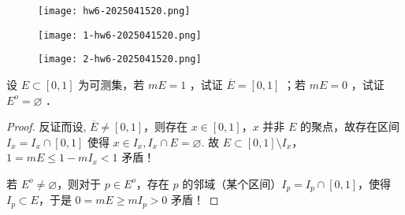 \begin{figure}[H]
\centering
\texttt{[image: hw6-2025041520.png]}
\label{}
\end{figure}
\begin{figure}[H]
\centering
\texttt{[image: 1-hw6-2025041520.png]}
\label{}
\end{figure}
\begin{figure}[H]
\centering
\texttt{[image: 2-hw6-2025041520.png]}
\label{}
\end{figure}

\begin{exercise}
设 $E \subset[0,1]$ 为可测集，若 $m E=1$ ，试证 $\overline{E}=[0,1]$ ；若 $m E=0$ ，试证 $E^o=\varnothing$ ．
\end{exercise}
\begin{proof}
反证而设, $\overline{E}\neq[0,1]$，则存在 $x\in[0,1]$，$x$ 并非 $E$ 的聚点，故存在区间 $I_{x}=I_{x}\cap [0,1]$ 使得 $x\in I_{x},I_{x}\cap E=\varnothing$. 故 $E\subset[0,1]\setminus I_{x}$，$1=mE\leq 1-mI_{x}<1$ 矛盾！

若 $E^{o}\neq \varnothing$，则对于 $p\in E^{o}$，存在 $p$ 的邻域（某个区间）$I_{p}=I_{p}\cap [0,1]$，使得 $I_{p}\subset E$，于是 $0=mE\geq mI_{p}>0$ 矛盾！
\end{proof}

